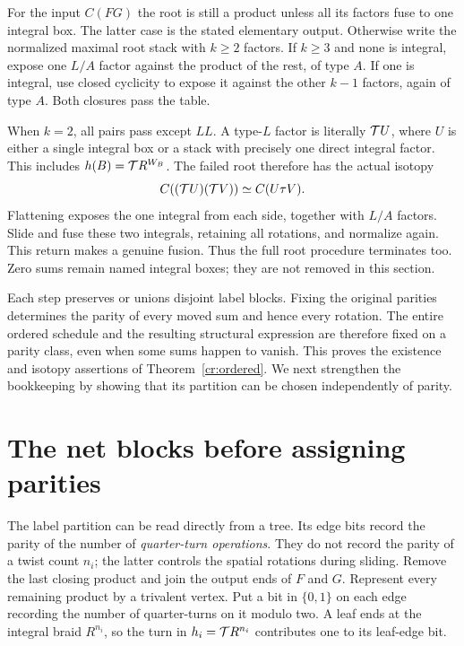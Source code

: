 For the input $C(FG)$ the root is still a product unless all its factors fuse to one integral box. The latter case is the stated elementary output. Otherwise write the normalized maximal root stack with $k\ge2$ factors. If $k\ge3$ and none is integral, expose one $L/A$ factor against the product of the rest, of type $A$. If one is integral, use closed cyclicity to expose it against the other $k-1$ factors, again of type $A$. Both closures pass the table.

When $k=2$, all pairs pass except $LL$. A type-$L$ factor is literally $\mathcal T U$, where $U$ is either a single integral box or a stack with precisely one direct integral factor. This includes $h(B)=\mathcal T R^{W_B}$. The failed root therefore has the actual isotopy
\begin{equation}\label{cr:failed-root}
                C((\mathcal T U)(\mathcal T V))\simeq C(U\tau V).
\end{equation}
Flattening exposes the one integral from each side, together with $L/A$ factors. Slide and fuse these two integrals, retaining all rotations, and normalize again. This return makes a genuine fusion. Thus the full root procedure terminates too. Zero sums remain named integral boxes; they are not removed in this section.

Each step preserves or unions disjoint label blocks. Fixing the original parities determines the parity of every moved sum and hence every rotation. The entire ordered schedule and the resulting structural expression are therefore fixed on a parity class, even when some sums happen to vanish. This proves the existence and isotopy assertions of Theorem~\ref{cr:ordered}. We next strengthen the bookkeeping by showing that its partition can be chosen independently of parity.

\section{The net blocks before assigning parities}\label{cr:partition}

The label partition can be read directly from a tree. Its edge bits
record the parity of the number of \emph{quarter-turn operations}.
They do not record the parity of a twist count $n_i$; the latter
controls the spatial rotations during sliding. Remove the last closing product and join the output ends of $F$ and $G$. Represent every remaining product by a trivalent vertex. Put a bit in $\{0,1\}$ on each edge recording the number of quarter-turns on it modulo two. A leaf ends at the integral braid $R^{n_i}$, so the turn in $h_i=\mathcal T R^{n_i}$ contributes one to its leaf-edge bit.

